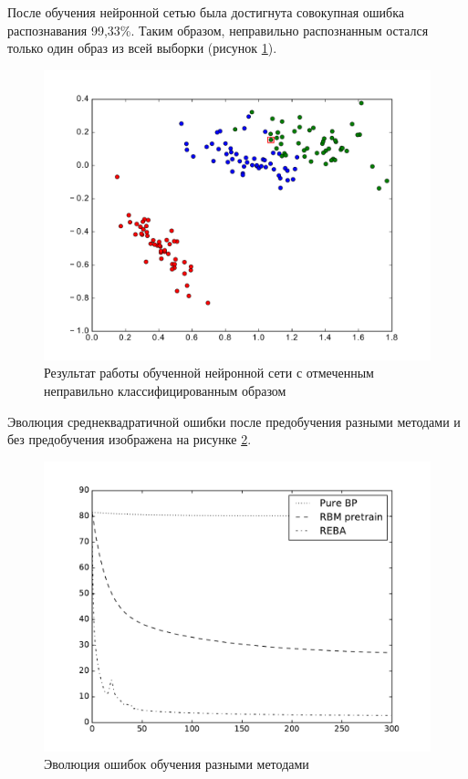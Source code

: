 После обучения нейронной сетью была достигнута совокупная ошибка распознавания 99,33\%. Таким образом, неправильно распознанным остался только один образ из всей выборки (рисунок \ref{fig:fisher_irises_results}).

\begin{figure}[h]
	\begin{center}
		\includegraphics[width=12cm]{man-source/images/ch3/pic3-10.pdf}
		\caption{Результат работы обученной нейронной сети с отмеченным неправильно классифицированным образом}				
		\label{fig:fisher_irises_results}
	\end{center}
\end{figure}

Эволюция среднеквадратичной ошибки после предобучения разными методами и без предобучения изображена на рисунке \ref{fig:error_evolution}.

\begin{figure}[h]
	\begin{center}
		\includegraphics[width=12cm]{man-source/images/ch3/pic3-11.pdf}
		\caption{Эволюция ошибок обучения разными методами}	
		\label{fig:error_evolution}
	\end{center}
\end{figure}

